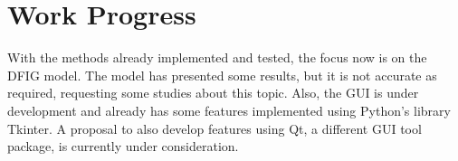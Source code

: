 \section{Work Progress}

With the methods already implemented and tested, the focus now is on the DFIG model. The model has presented some results, but it is not accurate as required, requesting some studies about this topic. Also, the GUI is under development and already has some features implemented using Python's library Tkinter. A proposal to also develop features using Qt, a different GUI tool package, is currently under consideration.